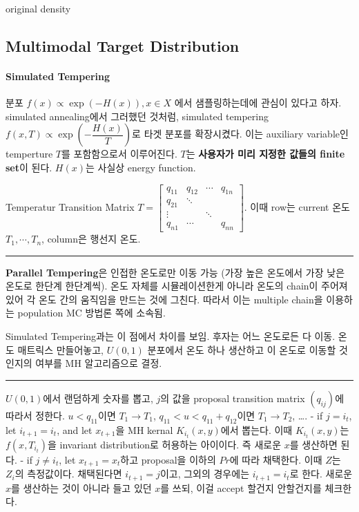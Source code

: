 \documentclass[
]{book}
\begin{document}
original density

\hypertarget{multimodal-target-distribution}{%
\subsection{Multimodal Target Distribution}\label{multimodal-target-distribution}}

\hypertarget{simulated-tempering}{%
\paragraph{Simulated Tempering}\label{simulated-tempering}}

분포 \(f(x) \propto \exp \left(-H(x) \right), x \in X\) 에서 샘플링하는데에 관심이 있다고 하자. simulated annealing에서 그러했던 것처럼, simulated tempering \(f(x, T) \propto \exp \left( -\dfrac {H(x)} {T} \right)\)로 타겟 분포를 확장시켰다. 이는 auxiliary variable인 temperture \(T\)를 포함함으로서 이루어진다. \(T\)는 \textbf{사용자가 미리 지정한 값들의 finite set}이 된다. \(H(x)\)는 사실상 energy function.

Temperatur Transition Matrix \(T = \begin{bmatrix} q_{11} & q_{12} & \cdots & q_{1n} \\ q_{21} & \ddots & & \\ \vdots & & \ddots & \\ q_{n1} & \cdots & & q_{nn} \end{bmatrix}\). 이때 row는 current 온도 \(T_1, \cdots, T_n\), column은 행선지 온도.

\begin{center}\rule{0.5\linewidth}{0.5pt}\end{center}

\textbf{Parallel Tempering}은 인접한 온도로만 이동 가능 (가장 높은 온도에서 가장 낮은 온도로 한단계 한단계씩). 온도 자체를 시뮬레이션한게 아니라 온도의 chain이 주어져 있어 각 온도 간의 움직임을 만드는 것에 그친다. 따라서 이는 multiple chain을 이용하는 population MC 방법론 쪽에 소속됨.

Simulated Tempering과는 이 점에서 차이를 보임. 후자는 어느 온도로든 다 이동. 온도 매트릭스 만들어놓고, \(U(0,1)\) 분포에서 온도 하나 생산하고 이 온도로 이동할 것인지의 여부를 MH 알고리즘으로 결정.

\begin{center}\rule{0.5\linewidth}{0.5pt}\end{center}

\(U(0,1)\)에서 랜덤하게 숫자를 뽑고, \(j\)의 값을 proposal transition matrix \((q_{ij})\)에 따라서 정한다. \(u<q_{11}\)이면 \(T_1 \rightarrow T_1\), \(q_{11}<u<q_{11} + q_{12}\)이면 \(T_1 \rightarrow T_2\), \ldots.
- if \(j=i_t\), let \(i_{t+1}=i_t\), and let \(x_{t+1}\)을 MH kernal \(K_{i_t}(x,y)\)에서 뽑는다. 이때 \(K_{i_t}(x,y)\)는 \(f(x, T_{i_t})\)을 invariant distribution로 허용하는 아이이다. 즉 새로운 \(x\)를 생산하면 된다.
- if \(j \not= i_t\), let \(x_{t+1}=x_t\)하고 proposal을 이하의 \(Pr\)에 따라 채택한다. 이때 \(Z\)는 \(Z_i\)의 측정값이다. 채택된다면 \(i_{t+1} = j\)이고, 그외의 경우에는 \(i_{t+1} = i_t\)로 한다. 새로운 \(x\)를 생산하는 것이 아니라 들고 있던 \(x\)를 쓰되, 이걸 accept 할건지 안할건지를 체크한다.
\end{document}
